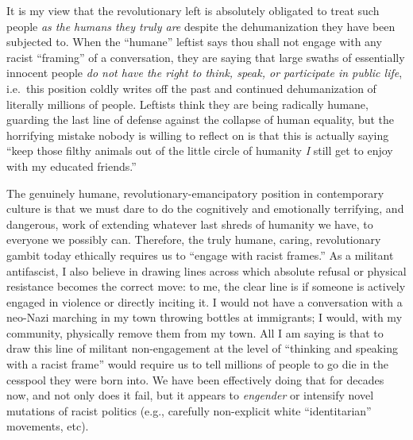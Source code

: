 \documentclass[a4paper,12pt,margin=.5in]{article}
\begin{document}
It is my view that the revolutionary left is absolutely obligated to
treat such people \emph{as the humans they truly are} despite the
dehumanization they have been subjected to. When the ``humane'' leftist
says thou shall not engage with any racist ``framing'' of a
conversation, they are saying that large swaths of essentially innocent
people \emph{do not have the right to think, speak, or participate in
public life}, i.e.~this position coldly writes off the past and
continued dehumanization of literally millions of people. Leftists think
they are being radically humane, guarding the last line of defense
against the collapse of human equality, but the horrifying mistake
nobody is willing to reflect on is that this is actually saying ``keep
those filthy animals out of the little circle of humanity \emph{I} still
get to enjoy with my educated friends.''

The genuinely humane, revolutionary-emancipatory position in
contemporary culture is that we must dare to do the cognitively and
emotionally terrifying, and dangerous, work of extending whatever last
shreds of humanity we have, to everyone we possibly can. Therefore, the
truly humane, caring, revolutionary gambit today ethically requires us
to ``engage with racist frames.'' As a militant antifascist, I also
believe in drawing lines across which absolute refusal or physical
resistance becomes the correct move: to me, the clear line is if someone
is actively engaged in violence or directly inciting it. I would not
have a conversation with a neo-Nazi marching in my town throwing bottles
at immigrants; I would, with my community, physically remove them from
my town. All I am saying is that to draw this line of militant
non-engagement at the level of ``thinking and speaking with a racist
frame'' would require us to tell millions of people to go die in the
cesspool they were born into. We have been effectively doing that for
decades now, and not only does it fail, but it appears to
\emph{engender} or intensify novel mutations of racist politics (e.g.,
carefully non-explicit white ``identitarian'' movements, etc).
\end{document}
